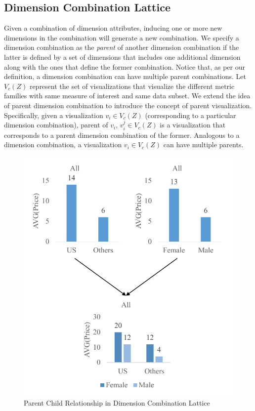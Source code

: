 \subsection{Dimension Combination Lattice}
Given a combination of dimension attributes, inducing one or more new dimensions in the combination will generate a new combination. We specify a dimension combination as the \emph{parent} of another dimension combination if the latter is defined by a set of dimensions that includes one additional dimension along with the ones that define the former combination. Notice that, as per our definition, a dimension combination can have multiple parent combinations.
 \newline
 \newline
Let $V_c(Z)$ represent the set of visualizations that visualize the different metric families with same measure of interest and same data subset. We extend the idea of parent dimension combination to introduce the concept of parent visualization. Specifically, given a visualization $v_i \in V_c(Z)$ (corresponding to a particular dimension combination), parent of $v_i$, $v_i^j \in V_c(Z)$ is a visualization that corresponds to a parent dimension combination of the former. Analogous to a dimension combination, a visualization $v_i \in V_c(Z)$ can have multiple parents. 

\begin{figure}[bht]
\label{example}
\centering
\includegraphics[scale=0.75]{DimensionRelation.pdf}
\caption{Parent Child Relationship in Dimension Combination Lattice}
\end{figure}
 


